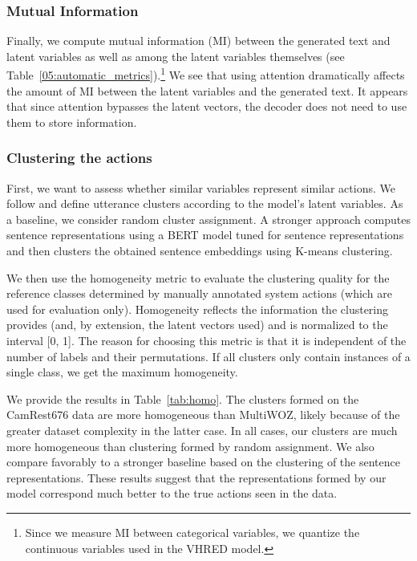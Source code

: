 \subsubsection{Mutual Information}
Finally, we compute mutual information (MI) between the generated text and latent variables as well as among the latent variables themselves (see Table~\ref{05:automatic_metrics}).\footnote{
Since we measure MI between categorical variables, we quantize the continuous variables used in the VHRED model.}
We see that using attention dramatically affects the amount of MI between the latent variables and the generated text.
It appears that since attention bypasses the latent vectors, the decoder does not need to use them to store information.

\subsubsection{Clustering the actions}
\label{sec:clustering}
First, we want to assess whether similar variables represent similar actions.
We follow \citet{zhao2018unsupervised} and define utterance clusters according to the model's latent variables.
As a baseline, we consider random cluster assignment.
A stronger approach computes sentence representations using a BERT model tuned for sentence representations \cite{reimers-2019-sentence-bert} and then clusters the obtained sentence embeddings using K-means clustering.

We then use the homogeneity metric \cite{rosenberg-hirschberg-2007-v} to evaluate the clustering quality for the reference classes determined by manually annotated system actions (which are used for evaluation only).
Homogeneity reflects the information the clustering provides (and, by extension, the latent vectors used) and is normalized to the interval [0, 1].
The reason for choosing this metric is that it is independent of the number of labels and their permutations.
If all clusters only contain instances of a single class, we get the maximum homogeneity.

We provide the results in Table~\ref{tab:homo}.
The clusters formed on the CamRest676 data are more homogeneous than MultiWOZ, likely because of the greater dataset complexity in the latter case. 
In all cases, our clusters are much more homogeneous than clustering formed by random assignment.
We also compare favorably to a stronger baseline based on the clustering of the sentence representations.
These results suggest that the representations formed by our model correspond much better to the true actions seen in the data.

